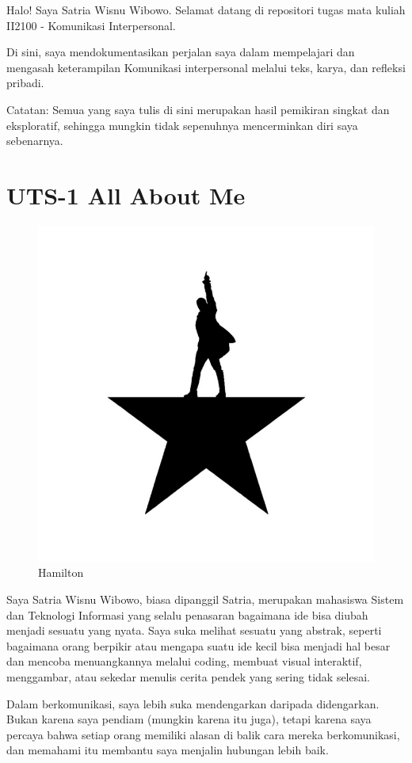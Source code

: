 \documentclass[
  letterpaper,
  DIV=11,
  numbers=noendperiod]{scrreprt}
\begin{document}
Halo! Saya Satria Wisnu Wibowo. Selamat datang di repositori tugas mata
kuliah II2100 - Komunikasi Interpersonal.

Di sini, saya mendokumentasikan perjalan saya dalam mempelajari dan
mengasah keterampilan Komunikasi interpersonal melalui teks, karya, dan
refleksi pribadi.

Catatan: Semua yang saya tulis di sini merupakan hasil pemikiran singkat
dan eksploratif, sehingga mungkin tidak sepenuhnya mencerminkan diri
saya sebenarnya.


\chapter{UTS-1 All About Me}\label{uts-1-all-about-me}

\begin{figure}[H]

{\centering \includegraphics[width=0.5\linewidth,height=\textheight,keepaspectratio]{All_About_me/../images/HamiltonLogo.jpg}

}

\caption{Hamilton}

\end{figure}%

Saya Satria Wisnu Wibowo, biasa dipanggil Satria, merupakan mahasiswa
Sistem dan Teknologi Informasi yang selalu penasaran bagaimana ide bisa
diubah menjadi sesuatu yang nyata. Saya suka melihat sesuatu yang
abstrak, seperti bagaimana orang berpikir atau mengapa suatu ide kecil
bisa menjadi hal besar dan mencoba menuangkannya melalui coding, membuat
visual interaktif, menggambar, atau sekedar menulis cerita pendek yang
sering tidak selesai.

Dalam berkomunikasi, saya lebih suka mendengarkan daripada didengarkan.
Bukan karena saya pendiam (mungkin karena itu juga), tetapi karena saya
percaya bahwa setiap orang memiliki alasan di balik cara mereka
berkomunikasi, dan memahami itu membantu saya menjalin hubungan lebih
baik.
\end{document}
